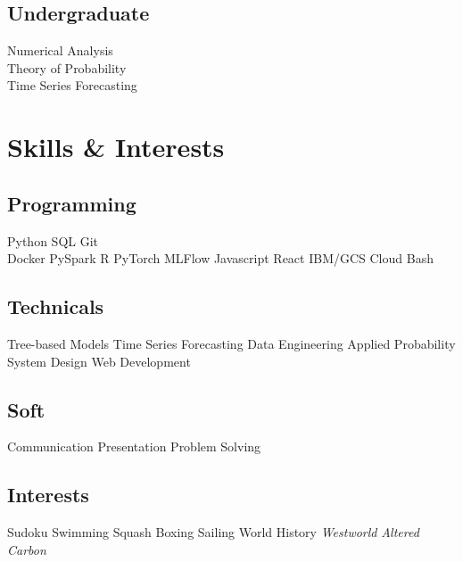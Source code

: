 \documentclass[]{deedy-resume-openfont}
\begin{document}
\begin{minipage}[t]{0.28\textwidth}
\sectionsep

\subsection{Undergraduate}
Numerical Analysis \\
Theory of Probability \\
Time Series Forecasting \\
\sectionsep


\section{Skills \& Interests}
\subsection{Programming}
Python \textbullet{} SQL \textbullet{} Git \\ 
Docker \textbullet{} PySpark \textbullet{} R \textbullet{}
PyTorch \textbullet{} MLFlow \textbullet{} Javascript \textbullet{} React \textbullet{} IBM/GCS Cloud \textbullet{} Bash
\sectionsep 

\subsection{Technicals}
Tree-based Models \textbullet{} Time Series Forecasting \textbullet{} Data Engineering \textbullet{} Applied Probability \textbullet{} System Design  \textbullet{} Web Development
\sectionsep

\subsection{Soft}
Communication \textbullet{} Presentation \textbullet{} Problem Solving
\sectionsep

\subsection{Interests}
Sudoku \textbullet{} Swimming \textbullet{} Squash \textbullet{} Boxing \textbullet{} Sailing \textbullet{} World History \textbullet{} \textit{Westworld} \textbullet{} \textit{Altered Carbon}
\sectionsep



\end{minipage}
\end{document}

